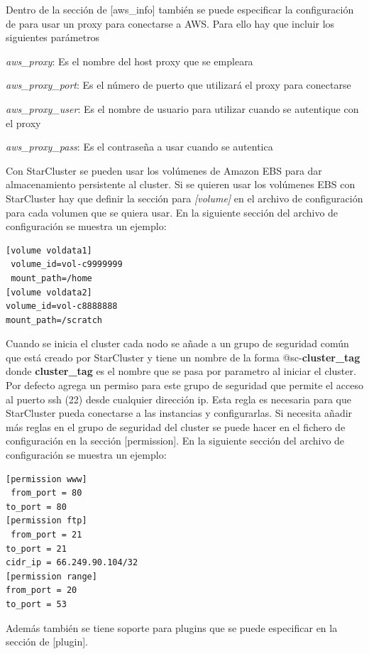 \documentclass{article}
\begin{document}
	Dentro de la sección de [aws\_info] también se puede especificar la configuración de para usar un proxy para conectarse a AWS. Para ello hay que incluir los siguientes parámetros
{\setlength{\parskip}{0mm} \begin{itemize}
{\setlength{\parskip}{0mm}
	\item 	\emph{aws\_proxy}: Es el nombre del host proxy que se empleara
	\item 	\emph{aws\_proxy\_port}: Es el número de puerto que utilizará el proxy para conectarse
	\item 	\emph{aws\_proxy\_user}: Es el nombre de usuario para utilizar cuando se autentique con el proxy
	\item 	\emph{aws\_proxy\_pass}: Es el contraseña a usar cuando se autentica 
}\end{itemize} }

	Con StarCluster se pueden usar los volúmenes de Amazon EBS para dar almacenamiento persistente al cluster. Si se quieren usar los volúmenes EBS con StarCluster hay que definir la sección para \emph{[volume]} en el archivo de configuración para cada volumen que se quiera usar. En la siguiente sección del archivo de configuración se muestra un ejemplo:
\begin{lstlisting}
[volume voldata1]
 volume_id=vol-c9999999
 mount_path=/home
[volume voldata2]
volume_id=vol-c8888888
mount_path=/scratch
\end{lstlisting}

	Cuando se inicia el cluster cada nodo se añade a un grupo de seguridad común que está creado por StarCluster y tiene un nombre de la forma @sc-\textbf{cluster\_tag} donde \textbf{cluster\_tag} es el nombre que se pasa por parametro al iniciar el cluster. Por defecto agrega un permiso para este grupo de seguridad que permite el acceso al puerto ssh (22) desde cualquier dirección ip. Esta regla es necesaria para que StarCluster pueda conectarse a las instancias y configurarlas. Si necesita añadir más reglas en el grupo de seguridad del cluster se puede hacer en el fichero de configuración en la sección [permission].  En la siguiente sección del archivo de configuración se muestra un ejemplo:
\begin{lstlisting}
[permission www]
 from_port = 80
to_port = 80
[permission ftp]
 from_port = 21
to_port = 21
cidr_ip = 66.249.90.104/32
[permission range]
from_port = 20
to_port = 53
\end{lstlisting}

	Además también se tiene soporte para plugins\cite{SystemPlugin} que se puede especificar en la sección de [plugin].
\end{document}
